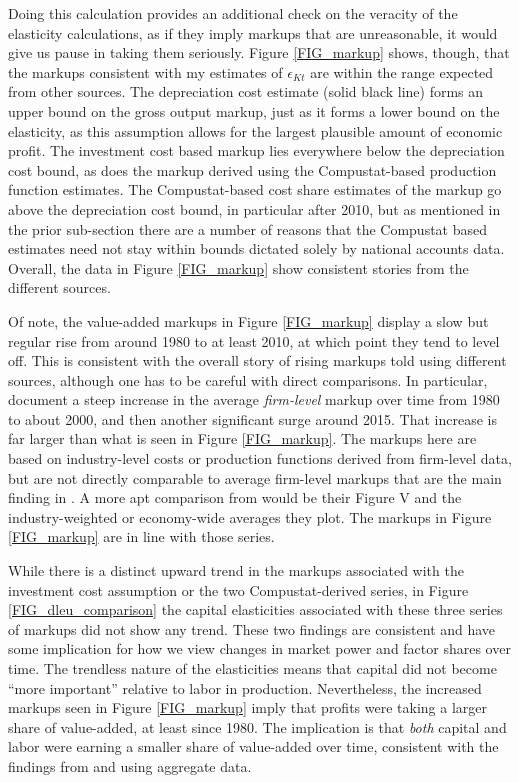 \documentclass[11pt]{article}
\begin{document}
Doing this calculation provides an additional check on the veracity of the elasticity calculations, as if they imply markups that are unreasonable, it would give us pause in taking them seriously. Figure \ref{FIG_markup} shows, though, that the markups consistent with my estimates of $\epsilon_{Kt}$ are within the range expected from other sources. The depreciation cost estimate (solid black line) forms an upper bound on the gross output markup, just as it forms a lower bound on the elasticity, as this assumption allows for the largest plausible amount of economic profit. The investment cost based markup lies everywhere below the depreciation cost bound, as does the markup derived using the Compustat-based production function estimates. The Compustat-based cost share estimates of the markup go above the depreciation cost bound, in particular after 2010, but as mentioned in the prior sub-section there are a number of reasons that the Compustat based estimates need not stay within bounds dictated solely by national accounts data. Overall, the data in Figure \ref{FIG_markup} show consistent stories from the different sources.

Of note, the value-added markups in Figure \ref{FIG_markup} display a slow but regular rise from around 1980 to at least 2010, at which point they tend to level off. This is consistent with the overall story of rising markups told using different sources, although one has to be careful with direct comparisons. In particular, \cite{dleu2020} document a steep increase in the average \textit{firm-level} markup over time from 1980 to about 2000, and then another significant surge around 2015. That increase is far larger than what is seen in Figure \ref{FIG_markup}. The markups here are based on industry-level costs or production functions derived from firm-level data, but are not directly comparable to average firm-level markups that are the main finding in \cite{dleu2020}. A more apt comparison from \cite{dleu2020} would be their Figure V and the industry-weighted or economy-wide averages they plot. The markups in Figure \ref{FIG_markup} are in line with those series. 

While there is a distinct upward trend in the markups associated with the investment cost assumption or the two Compustat-derived series, in Figure \ref{FIG_dleu_comparison} the capital elasticities associated with these three series of markups did not show any trend. These two findings are consistent and have some implication for how we view changes in market power and factor shares over time. The trendless nature of the elasticities means that capital did not become ``more important'' relative to labor in production. Nevertheless, the increased markups seen in Figure \ref{FIG_markup} imply that profits were taking a larger share of value-added, at least since 1980. The implication is that \textit{both} capital and labor were earning a smaller share of value-added over time, consistent with the findings from \cite{rognlie2015} and \cite{Barkai000} using aggregate data. 
\end{document}
